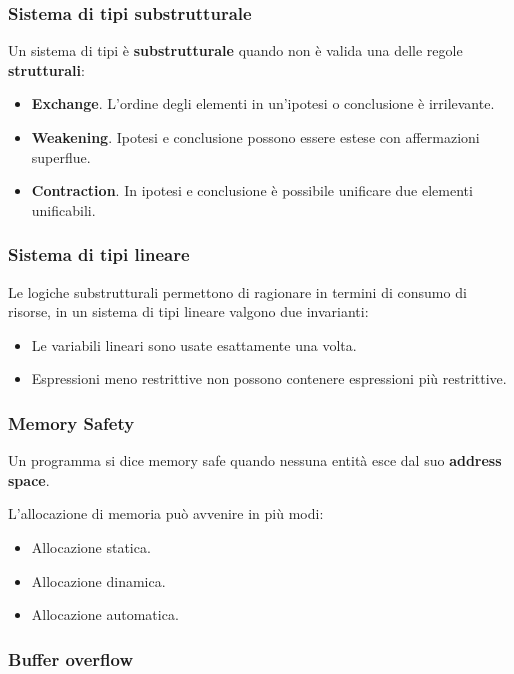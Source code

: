 \documentclass{beamer}
\begin{document}
\begin{frame}
    \frametitle{Sistema di tipi substrutturale}
    Un sistema di tipi è \textbf{substrutturale} quando non è valida una delle regole \textbf{strutturali}:
    \begin{itemize}
        \item \textbf{Exchange}. L'ordine degli elementi in un'ipotesi o conclusione è irrilevante. 
        \item \textbf{Weakening}. Ipotesi e conclusione possono essere estese con affermazioni superflue. 
        \item \textbf{Contraction}. In ipotesi e conclusione è possibile unificare due elementi unificabili. 
    \end{itemize} 
\end{frame}

\begin{frame}
    \frametitle{Sistema di tipi lineare}
    Le logiche substrutturali permettono di ragionare in termini di consumo di risorse, in un sistema di tipi lineare valgono due invarianti:
    \begin{itemize}
        \item Le variabili lineari sono usate esattamente una volta.
        \item Espressioni meno restrittive non possono contenere espressioni più restrittive.
    \end{itemize}
\end{frame}

\begin{frame}
    \frametitle{Memory Safety}
    Un programma si dice memory safe quando nessuna entità esce dal suo \textbf{address space}.
    
    L'allocazione di memoria può avvenire in più modi:
    \begin{itemize}
        \item Allocazione statica.
        \item Allocazione dinamica.
        \item Allocazione automatica.
    \end{itemize}    
\end{frame}

\begin{frame}
    \frametitle{Buffer overflow}
    
        
\end{frame}
\end{document}
